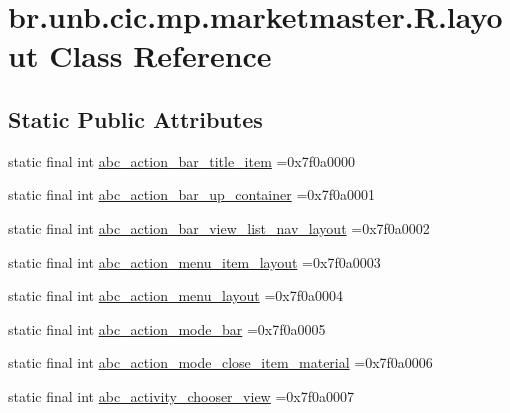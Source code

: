 \hypertarget{classbr_1_1unb_1_1cic_1_1mp_1_1marketmaster_1_1R_1_1layout}{}\section{br.\+unb.\+cic.\+mp.\+marketmaster.\+R.\+layout Class Reference}
\label{classbr_1_1unb_1_1cic_1_1mp_1_1marketmaster_1_1R_1_1layout}
\subsection*{Static Public Attributes}
\begin{DoxyCompactItemize}
\item 
static final int \mbox{\hyperlink{classbr_1_1unb_1_1cic_1_1mp_1_1marketmaster_1_1R_1_1layout_abb300bac2183fcb747a8d5a79fbac7f8}{abc\+\_\+action\+\_\+bar\+\_\+title\+\_\+item}} =0x7f0a0000
\item 
static final int \mbox{\hyperlink{classbr_1_1unb_1_1cic_1_1mp_1_1marketmaster_1_1R_1_1layout_ad004bb203232a2e36c5d6f87bba911af}{abc\+\_\+action\+\_\+bar\+\_\+up\+\_\+container}} =0x7f0a0001
\item 
static final int \mbox{\hyperlink{classbr_1_1unb_1_1cic_1_1mp_1_1marketmaster_1_1R_1_1layout_ab2878aa263e1e21c34a1a5fb71c0f70e}{abc\+\_\+action\+\_\+bar\+\_\+view\+\_\+list\+\_\+nav\+\_\+layout}} =0x7f0a0002
\item 
static final int \mbox{\hyperlink{classbr_1_1unb_1_1cic_1_1mp_1_1marketmaster_1_1R_1_1layout_a2193bd4de96bbec2df912416c5be4914}{abc\+\_\+action\+\_\+menu\+\_\+item\+\_\+layout}} =0x7f0a0003
\item 
static final int \mbox{\hyperlink{classbr_1_1unb_1_1cic_1_1mp_1_1marketmaster_1_1R_1_1layout_a6dc6e2dc3c55f375d192a7633e097071}{abc\+\_\+action\+\_\+menu\+\_\+layout}} =0x7f0a0004
\item 
static final int \mbox{\hyperlink{classbr_1_1unb_1_1cic_1_1mp_1_1marketmaster_1_1R_1_1layout_ad457e8c91cd487b94c3d84aab3476c97}{abc\+\_\+action\+\_\+mode\+\_\+bar}} =0x7f0a0005
\item 
static final int \mbox{\hyperlink{classbr_1_1unb_1_1cic_1_1mp_1_1marketmaster_1_1R_1_1layout_ae9f5a6fb8359b2bac167453ed19140af}{abc\+\_\+action\+\_\+mode\+\_\+close\+\_\+item\+\_\+material}} =0x7f0a0006
\item 
static final int \mbox{\hyperlink{classbr_1_1unb_1_1cic_1_1mp_1_1marketmaster_1_1R_1_1layout_a194454c85fb70a12c6736c18e7fd0a05}{abc\+\_\+activity\+\_\+chooser\+\_\+view}} =0x7f0a0007

\end{DoxyCompactItemize}
